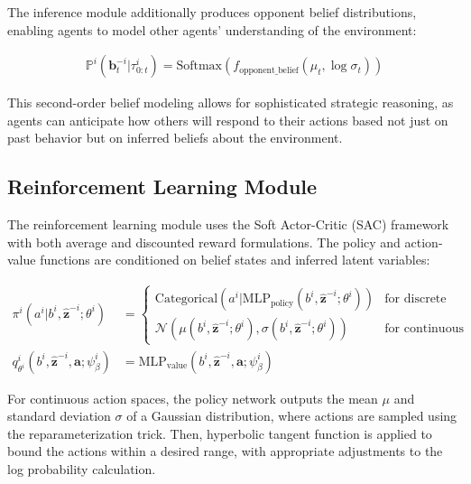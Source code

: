 \documentclass[a4paper,12pt]{report}
\begin{document}
The inference module additionally produces opponent belief distributions, enabling agents to model other agents' understanding of the environment:

\begin{align}
    \mathbb{P}^i(\boldsymbol{b}^{-i}_t|\tau^i_{0:t}) = \text{Softmax}(f_{\text{opponent\_belief}}(\mu_t, \log\sigma_t))
\end{align}

This second-order belief modeling allows for sophisticated strategic reasoning, as agents can anticipate how others will respond to their actions based not just on past behavior but on inferred beliefs about the environment.

\subsection{Reinforcement Learning Module}

The reinforcement learning module uses the Soft Actor-Critic (SAC) framework with both average and discounted reward formulations. The policy and action-value functions are conditioned on belief states and inferred latent variables:

\begin{align}
    \pi^i(a^i|b^i, \boldsymbol{\hat{z}}^{-i}; \theta^i)                            & =
    \begin{cases}
        \text{Categorical}(a^i|\text{MLP}_{\text{policy}}(b^i, \boldsymbol{\hat{z}}^{-i}; \theta^i))                 & \text{for discrete actions}   \\
        \mathcal{N}(\mu(b^i, \boldsymbol{\hat{z}}^{-i}; \theta^i), \sigma(b^i, \boldsymbol{\hat{z}}^{-i}; \theta^i)) & \text{for continuous actions}
    \end{cases}                 \\
    q^i_{\theta^i}(b^i, \boldsymbol{\hat{z}}^{-i}, \boldsymbol{a}; \psi^i_{\beta}) & = \text{MLP}_{\text{value}}(b^i, \boldsymbol{\hat{z}}^{-i}, \boldsymbol{a}; \psi^i_{\beta})
\end{align}

For continuous action spaces, the policy network outputs the mean $\mu$ and standard deviation $\sigma$ of a Gaussian distribution, where actions are sampled using the reparameterization trick. Then, hyperbolic tangent function is applied to bound the actions within a desired range, with appropriate adjustments to the log probability calculation.
\end{document}
